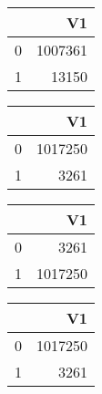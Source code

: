 \bigskip\bigskip
\centering
\begin{tabular}{rr}
  \hline
 & V1 \\ 
  \hline
0 & 1007361 \\ 
  1 & 13150 \\ 
   \hline
\end{tabular}

\bigskip\bigskip
\centering
\begin{tabular}{rr}
  \hline
 & V1 \\ 
  \hline
0 & 1017250 \\ 
  1 & 3261 \\ 
   \hline
\end{tabular}

\bigskip\bigskip
\centering
\begin{tabular}{rr}
  \hline
 & V1 \\ 
  \hline
0 & 3261 \\ 
  1 & 1017250 \\ 
   \hline
\end{tabular}

\bigskip\bigskip
\centering
\begin{tabular}{rr}
  \hline
 & V1 \\ 
  \hline
0 & 1017250 \\ 
  1 & 3261 \\ 
   \hline
\end{tabular}

